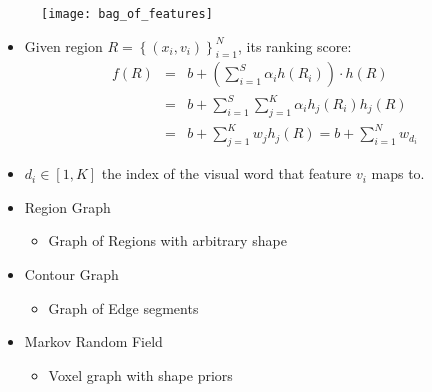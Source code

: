 \documentclass[11pt, a4paper, landscape]{article}
\begin{document}
\NewPage{}
\vfill
\begin{figure}
	\centering
	\texttt{[image: bag\_of\_features]}
\end{figure}
\begin{itemize}
\item Given region $R = \left\lbrace (x_i, v_i) \right\rbrace _{i = 1} ^N$, its ranking score:
\begin{equation*}
\begin{array}{lcl}
f(R) & = & b + (\sum\limits_{i = 1}^{S}\alpha_ih(R_i)) \cdot h(R)\\
     & = & b + \sum\limits_{i = 1}^{S}\sum\limits_{j = 1}^{K} \alpha_ih_j(R_i)h_j(R)\\
     & = & b + \sum\limits_{j = 1}^{K} w_jh_j(R) = b + \sum\limits_{i = 1}^{N} w_{d_i}
\end{array}
\end{equation*}
\item $d_i \in \left[ 1, K \right] $ the index of the visual word that feature $v_i$ maps to.
\end{itemize}
\vfill


\NewPage{}
\vfill
\begin{itemize}
\item Region Graph
\begin{itemize}
\item Graph of Regions with arbitrary shape
\end{itemize}
\vfill
\item Contour Graph
\begin{itemize}
\item Graph of Edge segments
\end{itemize}
\vfill
\item Markov Random Field
\begin{itemize}
\item Voxel graph with shape priors
\end{itemize}
\end{itemize}
\vfill
\end{document}
